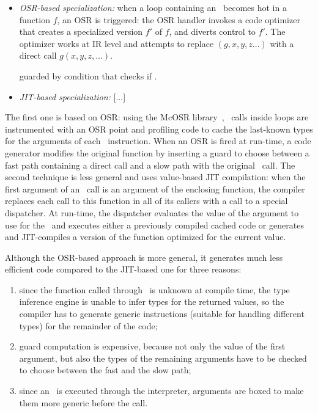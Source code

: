 \begin{itemize}
\item {\em OSR-based specialization:} when a loop containing an \feval\ becomes hot in a function $f$, an OSR is triggered: the OSR handler invokes a code optimizer that creates a specialized version $f'$ of $f$, and diverts control to $f'$. The optimizer works at IR level and attempts to replace \feval$(g,x,y,z...)$ with a direct call $g(x,y,z,...)$.

guarded by condition that checks if .
\item {\em JIT-based specialization:}  [...]
\end{itemize}

\ifdefined\fullver
The first one is based on OSR: using the McOSR library~\cite{lameed2013modular}, \feval\ calls inside loops are instrumented with an OSR point and profiling code to cache the last-known types for the arguments of each \feval\ instruction. When an OSR is fired at run-time, a code generator modifies the original function by inserting a guard to choose between a fast path containing a direct call and a slow path with the original \feval\ call. The second technique is less general and uses value-based JIT compilation: when the first argument of an \feval\ call is an argument of the enclosing function, the compiler replaces each call to this function in all of its callers with a call to a special dispatcher. At run-time, the dispatcher evaluates the value of the argument to use for the \feval\ and executes either a previously compiled cached code or generates and JIT-compiles a version of the function optimized for the current value.

Although the OSR-based approach is more general, it generates much less efficient code compared to the JIT-based one for three reasons:
\begin{enumerate}
\item since the function called through \feval\ is unknown at compile time, the type inference engine is unable to infer types for the returned values, so the compiler has to generate generic instructions (suitable for handling different types) for the remainder of the code;
\item guard computation is expensive, because not only the value of the first argument, but also the types of the remaining arguments have to be checked to choose between the fast and the slow path;
\item since an \feval\ is executed through the interpreter, arguments are boxed to make them more generic before the call.
\end{enumerate}

